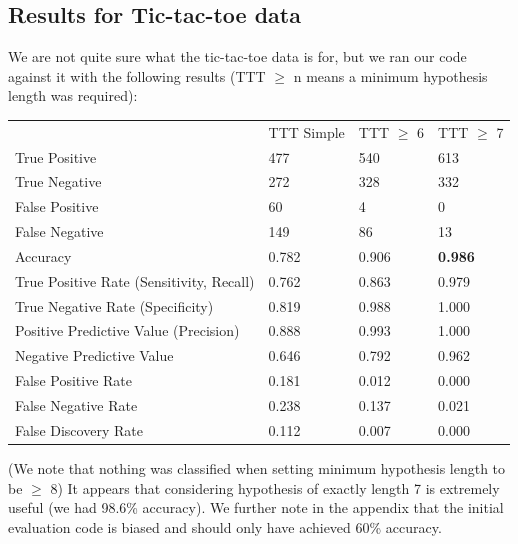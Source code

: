 \documentclass[12pt, a4, epsf] {article}
\theoremstyle{plain}
\theoremstyle{definition}
\begin{document}
\subsection*{Results for Tic-tac-toe data}
We are not quite sure what the tic-tac-toe data is for, but we ran our code against it with the following results (TTT $\geq$ n means a minimum hypothesis length was required):\\
\begin{table}[htbp]
\begin{tabular}{llll}
                                         & TTT Simple & TTT $\geq$ 6 & TTT $\geq$ 7 \\
True Positive                            & 477        & 540                  & 613                  \\
True Negative                            & 272        & 328                  & 332                  \\
False Positive                           & 60         & 4                    & 0                    \\
False Negative                           & 149        & 86                   & 13                   \\
Accuracy                                 & 0.782      & 0.906                & \textbf{0.986               } \\
True Positive Rate (Sensitivity, Recall) & 0.762      & 0.863                & 0.979                \\
True Negative Rate (Specificity)         & 0.819      & 0.988                & 1.000                \\
Positive Predictive Value (Precision)    & 0.888      & 0.993                & 1.000                \\
Negative Predictive Value                & 0.646      & 0.792                & 0.962                \\
False Positive Rate                      & 0.181      & 0.012                & 0.000                \\
False Negative Rate                      & 0.238      & 0.137                & 0.021                \\
False Discovery Rate                     & 0.112      & 0.007                & 0.000               
\end{tabular}
\end{table}
\FloatBarrier
(We note that nothing was classified when setting minimum hypothesis length to be $\geq$ 8)
It appears that considering hypothesis of exactly length 7 is extremely useful (we had 98.6\% accuracy). We further note in the appendix that the initial evaluation code is biased and should only have achieved 60\% accuracy.
\end{document}
